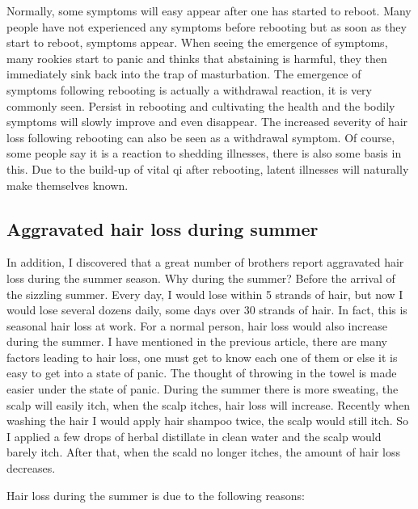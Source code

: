 \documentclass[
]{book}
\begin{document}
Normally, some symptoms will easy appear after one has started to reboot. Many people have not experienced any symptoms before rebooting but as soon as they start to reboot, symptoms appear. When seeing the emergence of symptoms, many rookies start to panic and thinks that abstaining is harmful, they then immediately sink back into the trap of masturbation. The emergence of symptoms following rebooting is actually a withdrawal reaction, it is very commonly seen. Persist in rebooting and cultivating the health and the bodily symptoms will slowly improve and even disappear. The increased severity of hair loss following rebooting can also be seen as a withdrawal symptom. Of course, some people say it is a reaction to shedding illnesses, there is also some basis in this. Due to the build-up of vital qi after rebooting, latent illnesses will naturally make themselves known.

\hypertarget{aggravated-hair-loss-during-summer}{%
\subsection{Aggravated hair loss during summer}\label{aggravated-hair-loss-during-summer}}

In addition, I discovered that a great number of brothers report aggravated hair loss during the summer season. Why during the summer? Before the arrival of the sizzling summer. Every day, I would lose within 5 strands of hair, but now I would lose several dozens daily, some days over 30 strands of hair. In fact, this is seasonal hair loss at work. For a normal person, hair loss would also increase during the summer. I have mentioned in the previous article, there are many factors leading to hair loss, one must get to know each one of them or else it is easy to get into a state of panic. The thought of throwing in the towel is made easier under the state of panic. During the summer there is more sweating, the scalp will easily itch, when the scalp itches, hair loss will increase. Recently when washing the hair I would apply hair shampoo twice, the scalp would still itch. So I applied a few drops of herbal distillate in clean water and the scalp would barely itch. After that, when the scald no longer itches, the amount of hair loss decreases.

Hair loss during the summer is due to the following reasons:
\end{document}
